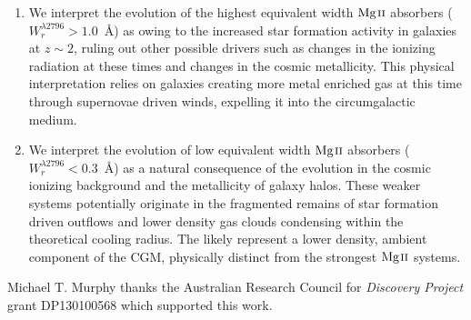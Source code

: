 \documentclass[iop,apj,numberedappendix,appendixfloats,twocolappendix]{emulateapj}
\begin{document}
\begin{enumerate}
\item We interpret the evolution of the highest equivalent width ${\hbox{{\rm Mg}\kern 0.1em{\sc ii}}}$ absorbers ($W_r^{\lambda2796} > 1.0$~{\AA}) as owing to the increased star formation activity in galaxies at $z \sim 2$, ruling out other possible drivers such as changes in the ionizing radiation at these times and changes in the cosmic metallicity. This physical interpretation relies on galaxies creating more metal enriched gas at this time through supernovae driven winds, expelling it into the circumgalactic medium. 
\item We interpret the evolution of low equivalent width ${\hbox{{\rm Mg}\kern 0.1em{\sc ii}}}$ absorbers ($W_r^{\lambda2796} < 0.3$~{\AA}) as a natural consequence of the evolution in the cosmic ionizing background and the metallicity of galaxy halos. These weaker systems potentially originate in the fragmented remains of star formation driven outflows and lower density gas clouds condensing within the theoretical cooling radius. The likely represent a lower density, ambient component of the CGM, physically distinct from the strongest ${\hbox{{\rm Mg}\kern 0.1em{\sc ii}}}$ systems. 
\end{enumerate}

Michael T. Murphy thanks the Australian Research Council for \textsl{Discovery Project} grant DP130100568 which supported this work.



\end{document}

